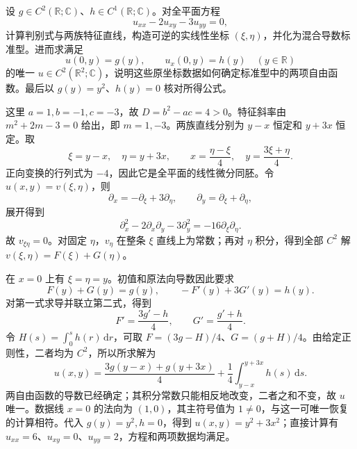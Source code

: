 \begin{exercise}\label{b2:ex:08-characteristic-cauchy-data}
设 \(g\in C^2(\mathbb R;\mathbb C)\)、\(h\in C^1(\mathbb R;\mathbb C)\)。对全平面方程
\[
 u_{xx}-2u_{xy}-3u_{yy}=0,
\]
计算判别式与两族特征直线，构造可逆的实线性坐标 \((\xi,\eta)\)，并化为混合导数标准型。进而求满足
\[
 u(0,y)=g(y),\qquad u_x(0,y)=h(y)\quad(y\in\mathbb R)
\]
的唯一 \(u\in C^2(\mathbb R^2;\mathbb C)\)，说明这些原坐标数据如何确定标准型中的两项自由函数。最后以 \(g(y)=y^2\)、\(h(y)=0\) 核对所得公式。
\end{exercise}
\begin{solution}
这里 \(a=1,b=-1,c=-3\)，故 \(D=b^2-ac=4>0\)。特征斜率由 \(m^2+2m-3=0\) 给出，即 \(m=1,-3\)。两族直线分别为 \(y-x\) 恒定和 \(y+3x\) 恒定。取
\[
 \xi=y-x,\quad\eta=y+3x,
 \qquad x=\frac{\eta-\xi}{4},\quad y=\frac{3\xi+\eta}{4}.
\]
正向变换的行列式为 \(-4\)，因此它是全平面的线性微分同胚。令 \(u(x,y)=v(\xi,\eta)\)，则
\[
 \partial_x=-\partial_\xi+3\partial_\eta,\qquad
 \partial_y=\partial_\xi+\partial_\eta,
\]
展开得到
\[
 \partial_x^2-2\partial_x\partial_y-3\partial_y^2
 =-16\partial_\xi\partial_\eta.
\]
故 \(v_{\xi\eta}=0\)。对固定 \(\eta\)，\(v_\eta\) 在整条 \(\xi\) 直线上为常数；再对 \(\eta\) 积分，得到全部 \(C^2\) 解 \(v(\xi,\eta)=F(\xi)+G(\eta)\)。

在 \(x=0\) 上有 \(\xi=\eta=y\)。初值和原法向导数因此要求
\[
 F(y)+G(y)=g(y),\qquad -F'(y)+3G'(y)=h(y).
\]
对第一式求导并联立第二式，得到
\[
 F'=\frac{3g'-h}{4},\qquad G'=\frac{g'+h}{4}.
\]
令 \(H(s)=\int_0^s h(r)\,\mathrm dr\)，可取
\(F=(3g-H)/4\)、\(G=(g+H)/4\)。由给定正则性，二者均为 \(C^2\)，所以所求解为
\[
 u(x,y)=\frac{3g(y-x)+g(y+3x)}4
       +\frac14\int_{y-x}^{y+3x}h(s)\,\mathrm ds.
\]
两自由函数的导数已经确定；其积分常数只能相反地改变，二者之和不变，故 \(u\) 唯一。数据线 \(x=0\) 的法向为 \((1,0)\)，其主符号值为 \(1\ne0\)，与这一可唯一恢复的计算相符。代入 \(g(y)=y^2,h=0\)，得到 \(u(x,y)=y^2+3x^2\)；直接计算有 \(u_{xx}=6\)、\(u_{xy}=0\)、\(u_{yy}=2\)，方程和两项数据均满足。
\end{solution}
